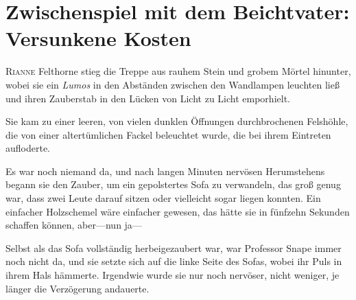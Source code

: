 \chapter{Zwischenspiel mit dem Beichtvater: Versunkene Kosten}

\lettrine{R}{ianne} Felthorne stieg die Treppe aus rauhem Stein und grobem Mörtel hinunter, wobei sie ein \emph{Lumos} in den Abständen zwischen den Wandlampen leuchten ließ und ihren Zauberstab in den Lücken von Licht zu Licht emporhielt.

Sie kam zu einer leeren, von vielen dunklen Öffnungen durchbrochenen Felshöhle, die von einer altertümlichen Fackel beleuchtet wurde, die bei ihrem Eintreten aufloderte.

Es war noch niemand da, und nach langen Minuten nervösen Herumstehens begann sie den Zauber, um ein gepolstertes Sofa zu verwandeln, das groß genug war, dass zwei Leute darauf sitzen oder vielleicht sogar liegen konnten. Ein einfacher Holzschemel wäre einfacher gewesen, das hätte sie in fünfzehn Sekunden schaffen können, aber—nun ja—

Selbst als das Sofa vollständig herbeigezaubert war, war Professor Snape immer noch nicht da, und sie setzte sich auf die linke Seite des Sofas, wobei ihr Puls in ihrem Hals hämmerte. Irgendwie wurde sie nur noch nervöser, nicht weniger, je länger die Verzögerung andauerte.

